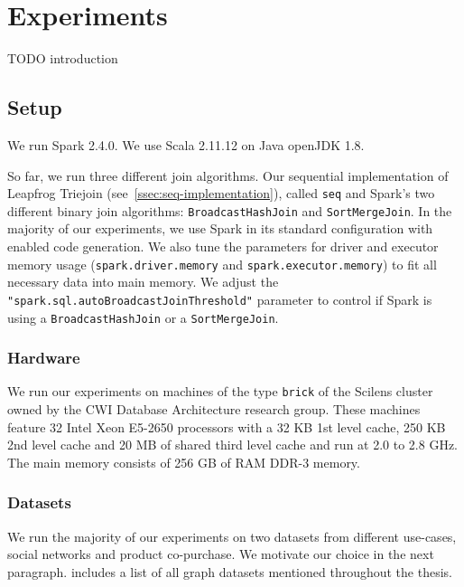 \section{Experiments}

TODO introduction

\subsection{Setup}


We run Spark 2.4.0.
We use Scala 2.11.12 on Java openJDK 1.8.

So far, we run three different join algorithms.
Our sequential implementation of Leapfrog Triejoin (see~\cref{ssec:seq-implementation}), called \texttt{seq} and Spark's two different binary join
algorithms: \texttt{BroadcastHashJoin} and \texttt{SortMergeJoin}.
In the majority of our experiments, we use Spark in its standard configuration with enabled code generation.
We also tune the parameters for driver and executor memory usage (\texttt{spark.driver.memory} and \texttt{spark.executor.memory}) to fit
all necessary data into main memory.
We adjust the \texttt{"spark.sql.autoBroadcastJoinThreshold"} parameter to control if Spark is using a \texttt{BroadcastHashJoin} or a \texttt{SortMergeJoin}.

\subsubsection{Hardware}

We run our experiments on machines of the type \texttt{brick} of the Scilens cluster owned by the CWI Database Architecture research group.
These machines feature 32 Intel Xeon E5-2650 processors with a 32 KB 1st level cache, 250 KB 2nd level cache and 20 MB of shared third level cache and run at 2.0 to 2.8 GHz.
The main memory consists of 256 GB of RAM DDR-3 memory.



\subsubsection{Datasets}
We run the majority of our experiments on two datasets from different use-cases, social networks and product co-purchase.
We motivate our choice in the next paragraph.
 includes a list of all graph datasets mentioned throughout the thesis.

